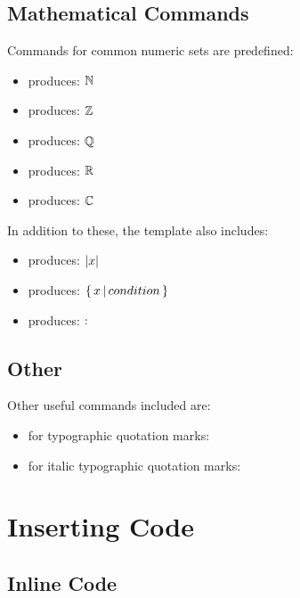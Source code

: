 \documentclass[]{csnotes}
\begin{document}
\subsection{Mathematical Commands}

Commands for common numeric sets are predefined:
\begin{itemize}
    \item {} produces: \(\mathbb{N}\)
    \item {} produces: \(\mathbb{Z}\)
    \item {} produces: \(\mathbb{Q}\)
    \item {} produces: \(\mathbb{R}\)
    \item {} produces: \(\mathbb{C}\)
\end{itemize}

In addition to these, the template also includes:
\begin{itemize}
    \item {} produces: \(\left|x\right|\)
    \item {} produces: \(\set{x}[condition]\)
    \item {} produces: \(:\)
\end{itemize}

\subsection{Other}

Other useful commands included are:
\begin{itemize}
    \item {} for typographic quotation marks: 
    \item {} for italic typographic quotation marks: 
\end{itemize}


\section{Inserting Code}

\subsection{Inline Code}
\end{document}
